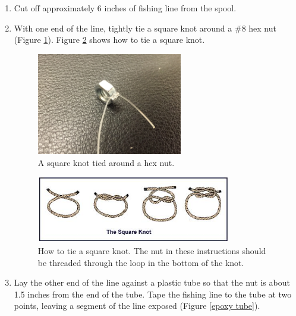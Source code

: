 \documentclass[letterpaper,12pt]{article}
\begin{document}
\begin{enumerate}
\item Cut off approximately 6 inches of fishing line from the spool.
%
\item With one end of the line, tightly tie a square knot around a \#8 hex nut (Figure \ref{nut square knot}). Figure \ref{square knot} shows how to tie a square knot.
%

\begin{figure}[ht]
	\centering
	\includegraphics[width=0.6\textwidth]{nut_knot}
	\caption{A square knot tied around a hex nut.}
	\label{nut square knot}
\end{figure}

\begin{figure}[ht]
	\centering
	\includegraphics[width=0.8\textwidth]{square_knot}
	\caption{How to tie a square knot. The nut in these instructions should be threaded through the loop in the bottom of the knot.}
	\label{square knot}
\end{figure}


\item Lay the other end of the line against a plastic tube so that the nut is about 1.5 inches from the end of the tube. Tape the fishing line to the tube at two points, leaving a segment of the line exposed (Figure \ref{epoxy tube}). %


\end{enumerate}
\end{document}

